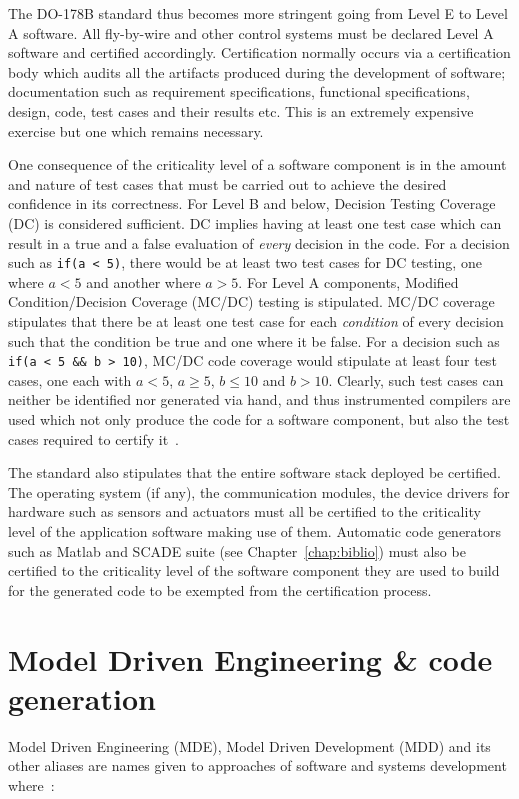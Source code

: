The DO-178B standard thus becomes more stringent going from Level E to
Level A software. All fly-by-wire and other control systems must be
declared Level A software and certified accordingly. Certification
normally occurs via a certification body which audits all the
artifacts produced during the development of software; documentation
such as requirement specifications, functional specifications, design,
code, test cases and their results etc. This is an extremely expensive
exercise but one which remains necessary.

One consequence of the criticality level of a software component is in
the amount and nature of test cases that must be carried out to
achieve the desired confidence in its correctness. For Level B and
below, Decision Testing Coverage (DC) is considered sufficient. DC
implies having at least one test case which can result in a true and a
false evaluation of \emph{every} decision in the code. For a decision
such as \texttt{if(a < 5)}, there would be at least two test cases for
DC testing, one where $a < 5$ and another where $a > 5$. For Level A
components, Modified Condition/Decision Coverage (MC/DC) testing is
stipulated. MC/DC coverage stipulates that there be at least one test
case for each \emph{condition} of every decision such that the
condition be true and one where it be false. For a decision such as
\texttt{if(a < 5 \&\& b > 10)}, MC/DC code coverage would stipulate at
least four test cases, one each with $a < 5$, $a \ge 5$, $b \le 10$
and $b > 10$. Clearly, such test cases can neither be identified nor
generated via hand, and thus instrumented compilers are used which not
only produce the code for a software component, but also the test
cases required to certify it~\cite{gasperoni@ae02}.

The standard also stipulates that the entire software stack deployed
be certified. The operating system (if any), the communication
modules, the device drivers for hardware such as sensors and actuators
must all be certified to the criticality level of the application
software making use of them. Automatic code generators such as Matlab
\simu and SCADE suite (see Chapter~\ref{chap:biblio})
must also be certified to the criticality level of the software
component they are used to build for the generated code to be exempted
from the certification process.

\section{Model Driven Engineering \& code generation}
Model Driven Engineering (MDE), Model Driven Development (MDD) and its
other aliases are names given to approaches of software and systems
development where~\cite{france@fose07}:

